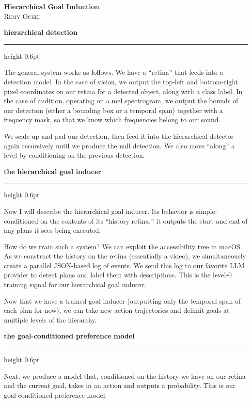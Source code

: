 \documentclass[10pt, a4paper]{article}
\newcommand{\cvsection}[1]{%
  \bigskip
  {\Large\bfseries\color{awesome}\MakeLowercase{#1}}%
  \par\vspace{2pt}%
  {\color{lighttext}\hrule height 0.6pt}%
  \medskip
}
\begin{document}
\begin{center}
  {\fontsize{28}{34}\selectfont\color{darktext}\textbf{Hierarchical Goal Induction}}\\[8pt]
  {\color{graytext}\textsc{Remy Ochei}}
\end{center}

\bigskip

\cvsection{Hierarchical Detection}

The general system works as follows. We have a ``retina'' that feeds into a detection model. In the case of vision, we output the top-left and bottom-right pixel coordinates on our retina for a detected object, along with a class label. In the case of audition, operating on a mel spectrogram, we output the bounds of our detection (either a bounding box or a temporal span) together with a frequency mask, so that we know which frequencies belong to our sound.

We scale up and pad our detection, then feed it into the hierarchical detector again recursively until we produce the null detection. We also move ``along'' a level by conditioning on the previous detection.

\cvsection{The Hierarchical Goal Inducer}

Now I will describe the hierarchical goal inducer. Its behavior is simple: conditioned on the contents of its ``history retina,'' it outputs the start and end of any plans it sees being executed.

How do we train such a system? We can exploit the accessibility tree in macOS. As we construct the history on the retina (essentially a video), we simultaneously create a parallel JSON-based log of events. We send this log to our favorite LLM provider to detect plans and label them with descriptions. This is the level-0 training signal for our hierarchical goal inducer.

Now that we have a trained goal inducer (outputting only the temporal span of each plan for now), we can take new action trajectories and delimit goals at multiple levels of the hierarchy.

\cvsection{The Goal-Conditioned Preference Model}

Next, we produce a model that, conditioned on the history we have on our retina and the current goal, takes in an action and outputs a probability. This is our goal-conditioned preference model.
\end{document}
